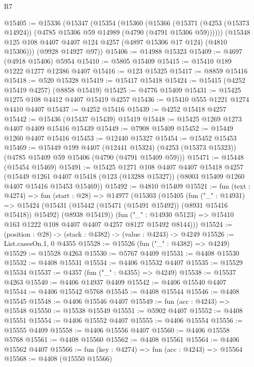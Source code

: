 \begin{lexlean}{R7}
\begin{coremodule}
@15405 := @15336
    (@15347
      (@15354
        (@15360
          (@15366
            (@15371 (@4253 (@15373 @14924)) (@4785 @15306 @59 @14989 (@4790 (@4791 @15306 @59))))))
        (@15348 @125 @108 @4407 @4407 @124 @4257 (@4897 @15306 @17 @124) (@4810 @15306)))
      (@9928 @14927 @97))
@15406 := @14988 @15323
@15409 := @4697 (@4918 @15406) @5954
@15410 := @5805 @15409
@15415 := @15410 @189 @1222 @1277 @12386 @4407
@15416 := @123 @15325
@15417 := @8859 @15416
@15418 := @520 @15328
@15419 := @15417 @15418
@15424 := @15415 (@4252 @15419 @4257) (@8858 @15419)
@15425 := @4776 @15409
@15431 := @15425 @1275 @108 @4412 @4407 @15419 @4257
@15436 := @15410 @555 @1221 @1274 @4410 @4407
@15437 := @4252 @15416
@15439 := @4252 @15418 @4257
@15442 := @15436 (@15437 @15439) @15419
@15448 := @15425 @1269 @1273 @4407 @4409 @15416 @15439
@15449 := @7908 @15409
@15452 := @15449 @1260 @4407 @15416
@15453 := @12440 @15327
@15454 := @15452 @15453
@15469 := @15449
    @199
    @4407
    (@12441 @15324)
    (@4253 (@15373 @15323))
    (@4785 @15409 @59 @15406 (@4790 (@4791 @15409 @59)))
@15471 := @15448 (@15454 @15469)
@15491 := @15425
    @1271
    @108
    @4407
    @4407
    @15418
    @4257
    (@15449
      @1261
      @4407
      @15418
      (@123 (@13288 @15327))
      (@8003 @15409 @1260 @4407 @15416 @15453 @15469))
@15492 := @4810 @15409
@15521 := fun (text : @4274) =>
  fun (start : @28) =>
  @14977
    (@15303
      (@15405
        (fun ("_" : @14931) =>
        @15424
          (@15431 (@15442 (@15471 (@15491 @15492)) (@8931 @15416 @15418)) @15492)
          (@8938 @15419))
        (fun ("_" : @14930 @5123) => @15410 @163 @1222 @108 @4407 @4407 @4257 @8127 @15492 @8144)))
@15524 := (position : @28) -> (stack : @4382) -> (value : @4243) -> @4249
@15526 := List.casesOn.{1, 0} @4355
@15528 := @15526 (fun ("_" : @4382) => @4249)
@15529 := @15528 @4263
@15530 := @5767 @4409
@15531 := @4408 @15530
@15532 := @4408 @15531
@15534 := @4406 @15532 @4407
@15535 := @15529 @15534
@15537 := @4357 (fun ("_" : @4355) => @4249)
@15538 := @15537 @4263
@15540 := @4406 @14937 @4409
@15542 := @4406 @15540 @4407
@15544 := @4406 @15542 @5768
@15545 := @4408 @15544
@15546 := @4408 @15545
@15548 := @4406 @15546 @4407
@15549 := fun (acc : @4243) => @15548
@15550 := @15538 @15549
@15551 := @5902 @4407
@15552 := @4408 @15551
@15554 := @4406 @15552 @4407
@15555 := @4406 @15554
@15556 := @15555 @4409
@15558 := @4406 @15556 @4407
@15560 := @4406 @15558 @5768
@15561 := @4408 @15560
@15562 := @4408 @15561
@15564 := @4406 @15562 @4407
@15566 := fun (key : @4274) => fun (acc : @4243) => @15564
@15568 := @4408 (@15550 @15566)

\end{coremodule}
\end{lexlean}
